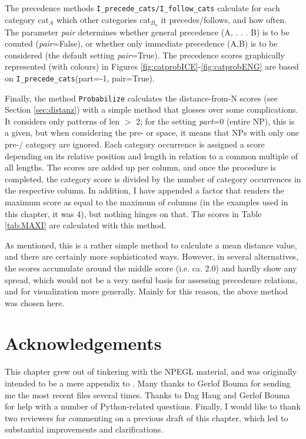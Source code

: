 \documentclass[output=paper,colorlinks,citecolor=brown,draft]{langscibook}
\begin{document}
The precedence methods \texttt{I\_precede\_cats/I\_follow\_cats} calculate for each category cat$_A$ which other categories cat$_{B_n}$ it precedes/follows, and how often. The parameter \textit{pair} determines whether general precedence (A, . . . B) is to be counted (\textit{pair}=False), or whether  only immediate precedence (A,B) is to be considered (the default setting \textit{pair}=True). The precedence scores graphically represented (with colours) in Figures \ref{fig:catprobICE}-\ref{fig:catprobENG} are based on \texttt{I\_precede\_cats}(part=-1, pair=True). 


Finally, the method \texttt{Probabilize} calculates the distance-from-N scores (see Section \ref{sec:distanz}) with a simple method that glosses over some complications. It considers only patterns of len $>$ 2; for the setting \textit{part}=0 (entire NP), this is a given, but when considering the pre- or  space, it means that NPs with only one pre-/ category are ignored. 
Each category occurrence is assigned a score depending on its relative position and  length in relation to a common multiple of all  lengths. The scores are added up per column, and once the procedure is completed, the category score is divided by the number of category occurrences in the respective column. In addition, I have appended a factor that renders the maximum score as equal to the maximum of columns (in the examples used in this chapter, it was 4), but nothing hinges on that. The scores in Table \ref{tab:MAXI} are calculated with this method. 

As mentioned, this is a rather simple method to calculate a mean distance value, and there are certainly more sophisticated ways. However, in several alternatives, the scores accumulate around the middle score (i.e. ca. 2.0) and hardly show any spread, which would not be a very useful basis for assessing precedence relations, and for visualization more generally. Mainly for this reason, the above method was chosen here. 


\section*{Acknowledgements}\largerpage

This chapter grew out of tinkering with the NPEGL  material, and was originally intended to be a mere appendix to . Many thanks to Gerlof Bouma for sending me the most recent  files several times. Thanks to Dag Haug and Gerlof Bouma for help with a number of Python-related questions. Finally, I would like to thank two reviewers for commenting on a previous draft of this chapter, which led to substantial improvements and clarifications.  


{\sloppy\printbibliography[heading=subbibliography,notkeyword=this]}
\end{document}
